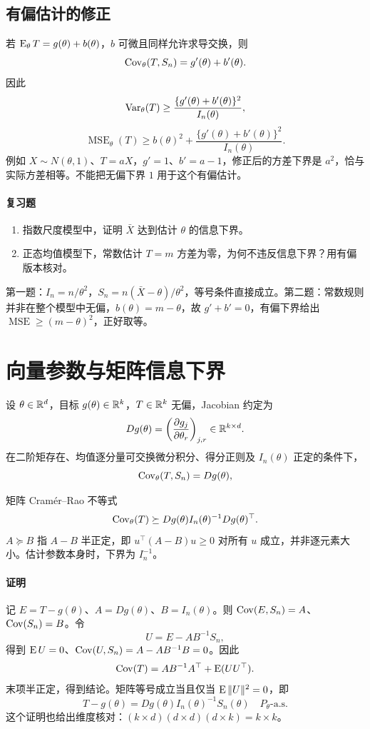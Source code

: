 \subsection{有偏估计的修正}
若 $\operatorname{E}_\theta T=g(\theta)+b(\theta)$，$b$ 可微且同样允许求导交换，则
\[
 \operatorname{Cov}_\theta(T,S_n)=g'(\theta)+b'(\theta).
\]
因此
\[
 \operatorname{Var}_\theta(T)\ge\frac{\{g'(\theta)+b'(\theta)\}^2}{I_n(\theta)},
\]
\[
 \operatorname{MSE}_\theta(T)
 \ge b(\theta)^2+
 \frac{\{g'(\theta)+b'(\theta)\}^2}{I_n(\theta)}.
\]
例如 $X\sim N(\theta,1)$、$T=aX$，$g'=1$、$b'=a-1$，修正后的方差下界是 $a^2$，恰与实际方差相等。不能把无偏下界 $1$ 用于这个有偏估计。

\paragraph{复习题}
\begin{enumerate}
 \item 指数尺度模型中，证明 $\bar X$ 达到估计 $\theta$ 的信息下界。
 \item 正态均值模型下，常数估计 $T=m$ 方差为零，为何不违反信息下界？用有偏版本核对。
\end{enumerate}
\begin{notebox}[答案线索]
第一题：$I_n=n/\theta^2$，$S_n=n(\bar X-\theta)/\theta^2$，等号条件直接成立。第二题：常数规则并非在整个模型中无偏，$b(\theta)=m-\theta$，故 $g'+b'=0$，有偏下界给出 $\operatorname{MSE}\ge(m-\theta)^2$，正好取等。
\end{notebox}

\section{向量参数与矩阵信息下界}

设 $\theta\in\mathbb R^d$，目标 $g(\theta)\in\mathbb R^k$，$T\in\mathbb R^k$ 无偏，Jacobian 约定为
\[
 Dg(\theta)=\left(\frac{\partial g_j}{\partial\theta_r}\right)_{j,r}
 \in\mathbb R^{k\times d}.
\]
在二阶矩存在、均值逐分量可交换微分积分、得分正则及 $I_n(\theta)$ 正定的条件下，
\[
 \operatorname{Cov}_\theta(T,S_n)=Dg(\theta),
\]
\begin{definitionbox}{矩阵 Cramér--Rao 不等式}
\[
 \operatorname{Cov}_\theta(T)\succeq
 Dg(\theta)I_n(\theta)^{-1}Dg(\theta)^\top.
\]
$A\succeq B$ 指 $A-B$ 半正定，即 $u^\top(A-B)u\ge0$ 对所有 $u$ 成立，并非逐元素大小。估计参数本身时，下界为 $I_n^{-1}$。
\end{definitionbox}

\paragraph{证明}
记 $E=T-g(\theta)$、$A=Dg(\theta)$、$B=I_n(\theta)$。则 $\operatorname{Cov}(E,S_n)=A$、$\operatorname{Cov}(S_n)=B$。令
\[
 U=E-AB^{-1}S_n,
\]
得到 $\operatorname{E} U=0$、$\operatorname{Cov}(U,S_n)=A-AB^{-1}B=0$。因此
\[
 \operatorname{Cov}(T)=AB^{-1}A^\top+\operatorname{E}(UU^\top).
\]
末项半正定，得到结论。矩阵等号成立当且仅当 $\operatorname{E}\|U\|^2=0$，即
\[
 T-g(\theta)=Dg(\theta)I_n(\theta)^{-1}S_n(\theta)
 \quad P_\theta\text{-a.s.}
\]
这个证明也给出维度核对：$(k\times d)(d\times d)(d\times k)=k\times k$。

